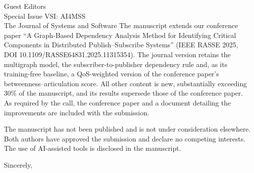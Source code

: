 \documentclass[10pt]{letter}
\begin{document}
\begin{letter}{Guest Editors\\Special Issue VSI: AI4MSS\\The Journal of Systems and Software}
The manuscript extends our conference paper ``A Graph-Based Dependency Analysis Method for Identifying Critical Components in Distributed Publish--Subscribe Systems'' (IEEE RASSE 2025, DOI 10.1109/\allowbreak RASSE64831.2025.11315354). The journal version retains the multigraph model, the subscriber-to-publisher dependency rule and, as its training-free baseline, a QoS-weighted version of the conference paper's betweenness--articulation score. All other content is new, substantially exceeding 30\% of the manuscript, and its results supersede those of the conference paper. As required by the call, the conference paper and a document detailing the improvements are included with the submission.

The manuscript has not been published and is not under consideration elsewhere. Both authors have approved the submission and declare no competing interests. The use of AI-assisted tools is disclosed in the manuscript.

\closing{Sincerely,}

\end{letter}
\end{document}
